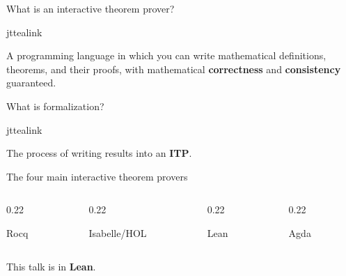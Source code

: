 \documentclass[aspectratio=169,10pt]{beamer}
\newcommand{\jtmeta}{\footnotesize}
\newcommand{\jtstack}[3]{%
  {\color{#1}\fontsize{17}{21}\selectfont\bfseries\raggedright #2\par}
  \ifx\relax#3\relax\else\vspace{5pt}{\jtmeta\color{jtgrey}\raggedright #3\par}\fi}
\begin{document}
\begin{frame}{What is an interactive theorem prover?}
  \vfill
  \begin{jtquote}[left=20pt,right=20pt,top=16pt,bottom=16pt]{jttealink}
    {\fontsize{17}{24}\selectfont\color{jtslate}%
      A programming language in which you can write mathematical definitions, 
      theorems, and their proofs, with mathematical
      {\bfseries correctness} and {\bfseries consistency} guaranteed.\par}
  \end{jtquote}
  \vfill
\end{frame}

\begin{frame}{What is formalization?}
  \vfill
  \begin{jtquote}[left=20pt,right=20pt,top=16pt,bottom=16pt]{jttealink}
    {\fontsize{17}{24}\selectfont\color{jtslate}%
      The process of writing results into an {\bfseries ITP}.\par}
  \end{jtquote}
  \vfill
\end{frame}

\begin{frame}{The four main interactive theorem provers}
  \vfill
  \begin{columns}[T,onlytextwidth]
    \begin{column}{0.22\textwidth}\jtstack{jtgrey}{Rocq}{}\end{column}
    \hfill
    \begin{column}{0.22\textwidth}\jtstack{jtgrey}{Isabelle/\allowbreak HOL}{}\end{column}
    \hfill
    \begin{column}{0.22\textwidth}\jtstack{jttealink}{Lean}{}\end{column}
    \hfill
    \begin{column}{0.22\textwidth}\jtstack{jtgrey}{Agda}{}\end{column}
  \end{columns}

  \vspace{22pt}
  {\color{jtgrey}This talk is in {\bfseries\color{jttealink}Lean}.\par}
  \vfill
\end{frame}
\end{document}
